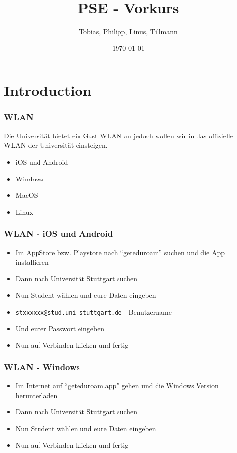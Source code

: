 \documentclass{../../presentation}
\title{PSE - Vorkurs}
\author{Tobias, Philipp, Linus, Tillmann}
\institute{FIUS - Fachgruppe Informatik Universität Stuttgart}
\date{\today}
\begin{document}
\begin{frame}
  \titlepage
\end{frame}

\begin{frame}
  \listoftodos
\end{frame}

\section{Introduction}

\begin{frame}[fragile]
  \frametitle{WLAN}
  Die Universität bietet ein Gast WLAN an jedoch wollen wir in das offizielle WLAN der Universität einsteigen.
  \newline
  \begin{itemize}
    \item iOS und Android
    \item Windows
    \item MacOS
    \item Linux
  \end{itemize}
\end{frame}

\begin{frame}[fragile]
  \frametitle{WLAN - iOS und Android}
  \begin{itemize}
    \item Im AppStore bzw. Playstore nach \enquote{geteduroam} suchen und die App installieren
    \item Dann nach Universität Stuttgart suchen
    \item Nun Student wählen und eure Daten eingeben
    \item \texttt{stxxxxxx@stud.uni-stuttgart.de} - Benutzername
    \item Und eurer Passwort eingeben
    \item Nun auf Verbinden klicken und fertig
  \end{itemize}
\end{frame}

\begin{frame}[fragile]
  \frametitle{WLAN - Windows}
  \begin{itemize}
    \item Im Internet auf \href{https://geteduroam.app}{\enquote{geteduroam.app}} gehen und die Windows Version herunterladen
    \item Dann nach Universität Stuttgart suchen
    \item Nun Student wählen und eure Daten eingeben
    \item Nun auf Verbinden klicken und fertig
  \end{itemize}
\end{frame}
\end{document}
